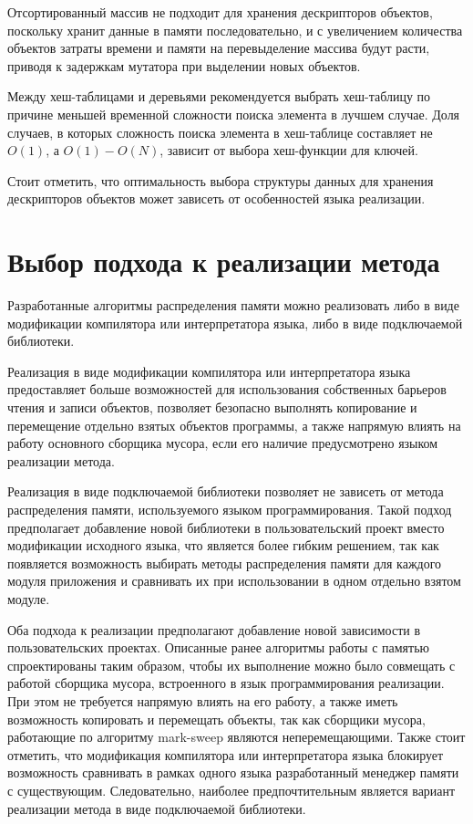 Отсортированный массив не подходит для хранения дескрипторов объектов, поскольку хранит данные в памяти последовательно, и с увеличением количества объектов затраты времени и памяти на перевыделение массива будут расти, приводя к задержкам мутатора при выделении новых объектов.

Между хеш-таблицами и деревьями рекомендуется выбрать хеш-таблицу по причине меньшей временной сложности поиска элемента в лучшем случае. Доля случаев, в которых сложность поиска элемента в хеш-таблице составляет не $O(1)$, а $O(1)-O(N)$, зависит от выбора хеш-функции для ключей.

Стоит отметить, что оптимальность выбора структуры данных для хранения дескрипторов объектов может зависеть от особенностей языка реализации.

\section*{Выбор подхода к реализации метода}

Разработанные алгоритмы распределения памяти можно реализовать либо в виде модификации компилятора или интерпретатора языка, либо в виде подключаемой библиотеки.

Реализация в виде модификации компилятора или интерпретатора языка предоставляет больше возможностей для использования собственных барьеров чтения и записи объектов, позволяет безопасно выполнять копирование и перемещение отдельно взятых объектов программы, а также напрямую влиять на работу основного сборщика мусора, если его наличие предусмотрено языком реализации метода. %
	
Реализация в виде подключаемой библиотеки позволяет не зависеть от метода распределения памяти, используемого языком программирования. Такой подход предполагает добавление новой библиотеки в пользовательский проект вместо модификации исходного языка, что является более гибким решением, так как появляется возможность выбирать методы распределения памяти для каждого модуля приложения и сравнивать их при использовании в одном отдельно взятом модуле.

Оба подхода к реализации предполагают добавление новой зависимости в пользовательских проектах. Описанные ранее алгоритмы работы с памятью спроектированы таким образом, чтобы их выполнение можно было совмещать с работой сборщика мусора, встроенного в язык программирования реализации. При этом не требуется напрямую влиять на его работу, а также иметь возможность копировать и перемещать объекты, так как сборщики мусора, работающие по алгоритму mark-sweep являются неперемещающими. Также стоит отметить, что модификация компилятора или интерпретатора языка блокирует возможность сравнивать в рамках одного языка разработанный менеджер памяти с существующим. Следовательно, наиболее предпочтительным является вариант реализации метода в виде подключаемой библиотеки.

